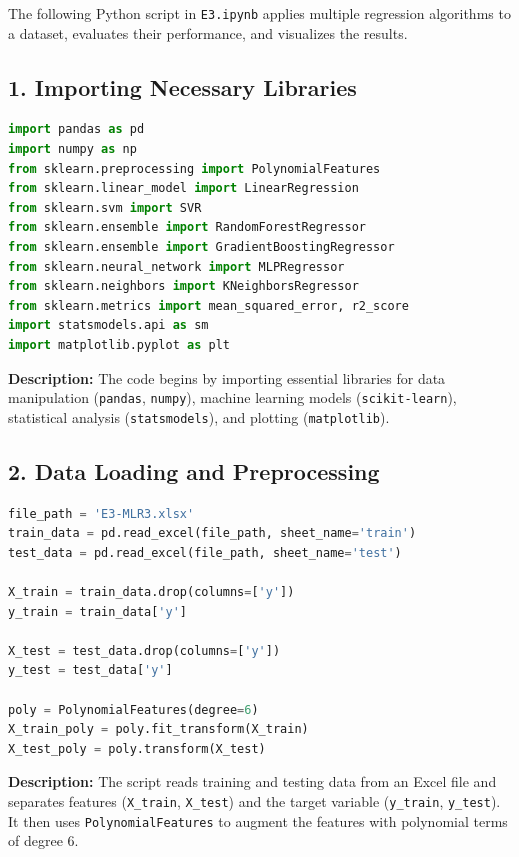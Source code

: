 The following Python script in \verb|E3.ipynb| applies multiple regression algorithms to a dataset, evaluates their performance, and visualizes the results.

\subsection*{1. Importing Necessary Libraries}
\begin{lstlisting}[language=Python, caption={Importing Libraries}]
import pandas as pd
import numpy as np
from sklearn.preprocessing import PolynomialFeatures
from sklearn.linear_model import LinearRegression
from sklearn.svm import SVR
from sklearn.ensemble import RandomForestRegressor
from sklearn.ensemble import GradientBoostingRegressor
from sklearn.neural_network import MLPRegressor
from sklearn.neighbors import KNeighborsRegressor
from sklearn.metrics import mean_squared_error, r2_score
import statsmodels.api as sm
import matplotlib.pyplot as plt
\end{lstlisting}
\textbf{Description:} The code begins by importing essential libraries for data manipulation (\texttt{pandas}, \texttt{numpy}), machine learning models (\texttt{scikit-learn}), statistical analysis (\texttt{statsmodels}), and plotting (\texttt{matplotlib}).

\subsection*{2. Data Loading and Preprocessing}
\begin{lstlisting}[language=Python, caption={Loading and Preprocessing Data}]
file_path = 'E3-MLR3.xlsx'
train_data = pd.read_excel(file_path, sheet_name='train')
test_data = pd.read_excel(file_path, sheet_name='test')

X_train = train_data.drop(columns=['y'])
y_train = train_data['y']

X_test = test_data.drop(columns=['y'])
y_test = test_data['y']

poly = PolynomialFeatures(degree=6)
X_train_poly = poly.fit_transform(X_train)
X_test_poly = poly.transform(X_test)
\end{lstlisting}
\textbf{Description:} The script reads training and testing data from an Excel file and separates features (\texttt{X\_train}, \texttt{X\_test}) and the target variable (\texttt{y\_train}, \texttt{y\_test}). It then uses \texttt{PolynomialFeatures} to augment the features with polynomial terms of degree 6.

